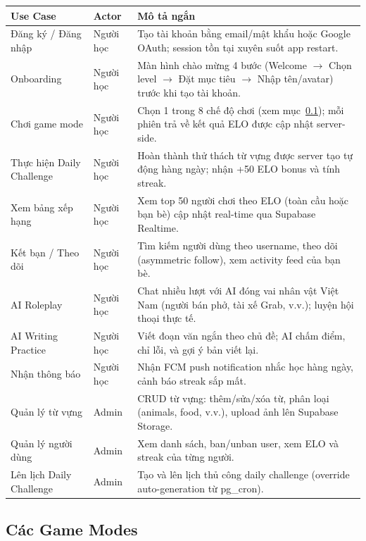 \documentclass[12pt,a4paper]{article}
\begin{document}
\begin{longtable}{@{}p{3.5cm}p{3cm}p{7cm}@{}}
\toprule
\textbf{Use Case} & \textbf{Actor} & \textbf{Mô tả ngắn} \\
\midrule
\endhead
Đăng ký / Đăng nhập & Người học & Tạo tài khoản bằng email/mật khẩu hoặc Google OAuth; session tồn tại xuyên suốt app restart. \\
\midrule
Onboarding & Người học & Màn hình chào mừng 4 bước (Welcome $\to$ Chọn level $\to$ Đặt mục tiêu $\to$ Nhập tên/avatar) trước khi tạo tài khoản. \\
\midrule
Chơi game mode & Người học & Chọn 1 trong 8 chế độ chơi (xem mục~\ref{sec:gamemodes}); mỗi phiên trả về kết quả ELO được cập nhật server-side. \\
\midrule
Thực hiện Daily Challenge & Người học & Hoàn thành thử thách từ vựng được server tạo tự động hàng ngày; nhận +50 ELO bonus và tính streak. \\
\midrule
Xem bảng xếp hạng & Người học & Xem top 50 người chơi theo ELO (toàn cầu hoặc bạn bè) cập nhật real-time qua Supabase Realtime. \\
\midrule
Kết bạn / Theo dõi & Người học & Tìm kiếm người dùng theo username, theo dõi (asymmetric follow), xem activity feed của bạn bè. \\
\midrule
AI Roleplay & Người học & Chat nhiều lượt với AI đóng vai nhân vật Việt Nam (người bán phở, tài xế Grab, v.v.); luyện hội thoại thực tế. \\
\midrule
AI Writing Practice & Người học & Viết đoạn văn ngắn theo chủ đề; AI chấm điểm, chỉ lỗi, và gợi ý bản viết lại. \\
\midrule
Nhận thông báo & Người học & Nhận FCM push notification nhắc học hàng ngày, cảnh báo streak sắp mất. \\
\midrule
Quản lý từ vựng & Admin & CRUD từ vựng: thêm/sửa/xóa từ, phân loại (animals, food, v.v.), upload ảnh lên Supabase Storage. \\
\midrule
Quản lý người dùng & Admin & Xem danh sách, ban/unban user, xem ELO và streak của từng người. \\
\midrule
Lên lịch Daily Challenge & Admin & Tạo và lên lịch thủ công daily challenge (override auto-generation từ pg\_cron). \\
\bottomrule
\end{longtable}

\subsection{Các Game Modes}
\label{sec:gamemodes}
\end{document}
